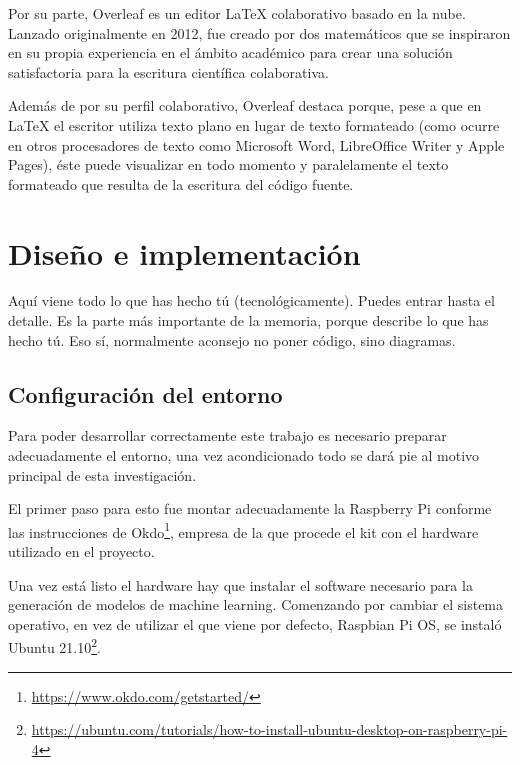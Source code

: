 \documentclass[a4paper, 12pt]{book}
\begin{document}
Por su parte, Overleaf es un editor LaTeX colaborativo basado en la nube. Lanzado originalmente en 2012, fue creado por dos matemáticos que se inspiraron en su propia experiencia en el ámbito académico para crear una solución satisfactoria para la escritura científica colaborativa.

Además de por su perfil colaborativo, Overleaf destaca porque, pese a que en LaTeX el escritor utiliza texto plano en lugar de texto formateado (como ocurre en otros procesadores de texto como Microsoft Word, LibreOffice Writer y Apple Pages), éste puede visualizar en todo momento y paralelamente el texto formateado que resulta de la escritura del código fuente.

\cleardoublepage


\chapter{Diseño e implementación}
\label{chap:diseño}


Aquí viene todo lo que has hecho tú (tecnológicamente). 
Puedes entrar hasta el detalle. 
Es la parte más importante de la memoria, porque describe lo que has hecho tú.
Eso sí, normalmente aconsejo no poner código, sino diagramas.

\section{Configuración del entorno}

Para poder desarrollar correctamente este trabajo es necesario preparar adecuadamente el entorno, una vez acondicionado todo se dará pie al motivo principal de esta investigación.

El primer paso para esto fue montar adecuadamente la Raspberry Pi conforme las instrucciones de Okdo\footnote{\url{https://www.okdo.com/getstarted/}}, empresa de la que procede el kit con el hardware utilizado en el proyecto.

Una vez está listo el hardware hay que instalar el software necesario para la generación de modelos de machine learning.
Comenzando por cambiar el sistema operativo, en vez de utilizar el que viene por defecto, Raspbian Pi OS, se instaló Ubuntu 21.10\footnote{\url{https://ubuntu.com/tutorials/how-to-install-ubuntu-desktop-on-raspberry-pi-4}}.
\end{document}
